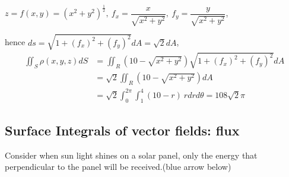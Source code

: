 \begin{spacing}{1.3}
    $z=f(x,y)=(x^2+y^2)^{\frac{1}{2}},\ f_x=\dfrac{x}{\sqrt{x^2+y^2}},\ f_y=\dfrac{y}{\sqrt{x^2+y^2}}$,

    hence $ds=\sqrt{1+(f_x)^2+(f_y)^2}dA=\sqrt{2} dA$,
    \begin{align*}
        \iint_S \rho(x,y,z) dS &= \iint_R \left(10-\sqrt{x^2+y^2}\right)\sqrt{1+(f_x)^2+(f_y)^2}dA\\
         &= \sqrt{2} \iint_R (10-\sqrt{x^2+y^2}) dA\\
         &= \sqrt{2} \int_0^{2\pi} \int_1^4 (10-r)\ r dr d\theta = 108\sqrt{2} \pi
    \end{align*}

    \newpage
    \subsection{Surface Integrals of vector fields: flux}
    
    Consider when sun light shines on a solar panel, only the energy that 
    perpendicular to the panel will be received.(blue arrow below)
    \begin{center}
        \begin{tikzpicture}[x=0.75pt,y=0.75pt,yscale=-1,xscale=1]


\end{tikzpicture}
\end{center}
\end{spacing}
